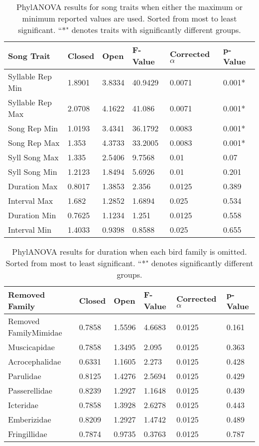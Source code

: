 \documentclass[a4paper,12pt]{article}
\begin{document}
\begin{table}[ht]
\caption{PhylANOVA results for song traits when either the maximum or minimum reported values are used.  Sorted from most to least significant.  ``*" denotes traits with significantly different groups.}
\centering
\begin{tabular}{llllll}
  \hline
Song Trait & Closed & Open & F-Value & Corrected $\alpha$ & p-Value \\ 
  \hline
Syllable Rep Min & 1.8901 & 3.8334 & 40.9429 & 0.0071 & 0.001* \\ 
  Syllable Rep Max & 2.0708 & 4.1622 & 41.086 & 0.0071 & 0.001* \\ 
  Song Rep Min & 1.0193 & 3.4341 & 36.1792 & 0.0083 & 0.001* \\ 
  Song Rep Max & 1.353 & 4.3733 & 33.2005 & 0.0083 & 0.001* \\ 
  Syll Song Max & 1.335 & 2.5406 & 9.7568 & 0.01 & 0.07 \\ 
  Syll Song Min & 1.2123 & 1.8494 & 5.6926 & 0.01 & 0.201 \\ 
  Duration Max & 0.8017 & 1.3853 & 2.356 & 0.0125 & 0.389 \\ 
  Interval Max & 1.682 & 1.2852 & 1.6894 & 0.025 & 0.534 \\ 
  Duration Min & 0.7625 & 1.1234 & 1.251 & 0.0125 & 0.558 \\ 
  Interval Min & 1.4033 & 0.9398 & 0.8588 & 0.025 & 0.655 \\ 
   \hline
\end{tabular}
\end{table}

\begin{table}[ht]
\centering
\caption{PhylANOVA results for duration when each bird family is omitted.  Sorted from most to least significant.  ``*" denotes significantly different groups.}
\begin{tabular}{llllll}
  \hline
Removed Family & Closed & Open & F-Value & Corrected $\alpha$ & p-Value \\ 
  \hline
Removed FamilyMimidae & 0.7858 & 1.5596 & 4.6683 & 0.0125 & 0.161 \\ 
  Muscicapidae & 0.7858 & 1.3495 & 2.095 & 0.0125 & 0.363 \\ 
  Acrocephalidae & 0.6331 & 1.1605 & 2.273 & 0.0125 & 0.428 \\ 
  Parulidae & 0.8125 & 1.4276 & 2.5694 & 0.0125 & 0.429 \\ 
  Passerellidae & 0.8239 & 1.2927 & 1.1648 & 0.0125 & 0.439 \\ 
  Icteridae & 0.7858 & 1.3928 & 2.6278 & 0.0125 & 0.443 \\ 
  Emberizidae & 0.8209 & 1.2927 & 1.4742 & 0.0125 & 0.489 \\ 
  Fringillidae & 0.7874 & 0.9735 & 0.3763 & 0.0125 & 0.787 \\ 
   \hline
\end{tabular}
\end{table}
\end{document}
